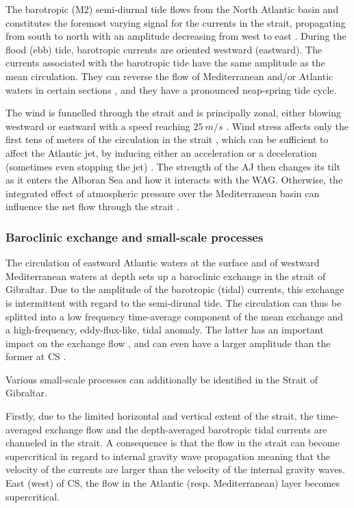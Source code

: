 The barotropic (M2) semi-diurnal tide flows from the North Atlantic basin and constitutes the foremost varying signal for the currents in the strait, propagating from south to north with an amplitude decreasing from west to east \citep{candela_1990}. During the flood (ebb) tide, barotropic currents are oriented westward (eastward). The currents associated with the barotropic tide have the same amplitude as the mean circulation. They can reverse the flow of Mediterranean and/or Atlantic waters in certain sections \citep{sanchez-roman_2012}, and they have a pronounced neap-spring tide cycle.

The wind is funnelled through the strait and is principally zonal, either blowing westward or eastward with a speed reaching $25\ m/s$ \citep{candela_1989}. Wind stress affects only the first tens of meters of the circulation in the strait \citep{candela_1989}, which can be sufficient to affect the Atlantic jet, by inducing either an acceleration or a deceleration (sometimes even stopping the jet) \citep{lorente_2019}. The strength of the AJ then changes its tilt as it enters the Alboran Sea and how it interacts with the WAG. Otherwise, the integrated effect of atmospheric pressure over the Mediterranean basin can influence the net flow through the strait \citep{garcialafuente_2002}.



\subsubsection{Baroclinic exchange and small-scale processes}


The circulation of eastward Atlantic waters at the surface and of westward Mediterranean waters at depth sets up a baroclinic exchange in the strait of Gibraltar. Due to the amplitude of the barotropic (tidal) currents, this exchange is intermittent with regard to the semi-dirunal tide. The circulation can thus be splitted into a low frequency time-average component of the mean exchange and a high-frequency, eddy-flux-like, tidal anomaly. The latter has an important impact on the exchange flow \citep{naranjo_2014}, and can even have a larger amplitude than the former at CS \citep{vargas_2006}.

Various small-scale processes can additionally be identified in the Strait of Gibraltar.

Firstly, due to the limited horizontal and vertical extent of the strait, the time-averaged exchange flow and the depth-averaged barotropic tidal currents are channeled in the strait. A consequence is that the flow in the strait can become supercritical in regard to internal gravity wave propagation meaning that the velocity of the currents are larger than the velocity of the internal gravity waves.  East (west) of CS, the flow in the Atlantic (resp. Mediterranean) layer becomes supercritical.



